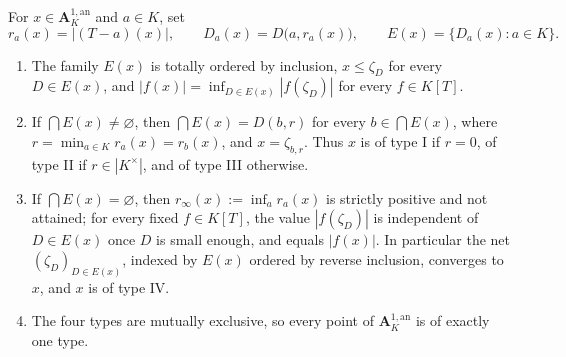 \begin{theorem}
\label{thm:berk-a1-classification}
For $x\in\mathbf A^{1,\mathrm{an}}_K$ and $a\in K$, set
\[
 r_a(x)=|(T-a)(x)|,\qquad
 D_a(x)=D\bigl(a,r_a(x)\bigr),\qquad
 E(x)=\{D_a(x):a\in K\}.
\]
\begin{enumerate}
\item\label{itm:berk-class:nested}
  The family $E(x)$ is totally ordered by inclusion, $x\leq\zeta_D$
  for every $D\in E(x)$, and
  $|f(x)|=\inf_{D\in E(x)}|f(\zeta_D)|$ for every $f\in K[T]$.
\item\label{itm:berk-class:nonempty}
  If $\bigcap E(x)\neq\varnothing$, then
  $\bigcap E(x)=D(b,r)$ for every $b\in\bigcap E(x)$, where
  $r=\min_{a\in K}r_a(x)=r_b(x)$, and $x=\zeta_{b,r}$.  Thus $x$
  is of type I if $r=0$, of type II if $r\in|K^\times|$, and of
  type III otherwise.
\item\label{itm:berk-class:empty}
  If $\bigcap E(x)=\varnothing$, then
  $r_\infty(x):=\inf_ar_a(x)$ is strictly positive and not attained;
  for every fixed $f\in K[T]$, the value $|f(\zeta_D)|$ is
  independent of $D\in E(x)$ once $D$ is small enough, and equals
  $|f(x)|$.  In particular the net $(\zeta_D)_{D\in E(x)}$, indexed
  by $E(x)$ ordered by reverse inclusion, converges to $x$, and
  $x$ is of type IV.
\item\label{itm:berk-class:exclusive}
  The four types are mutually exclusive, so every point of
  $\mathbf A^{1,\mathrm{an}}_K$ is of exactly one type.
\end{enumerate}
\end{theorem}

